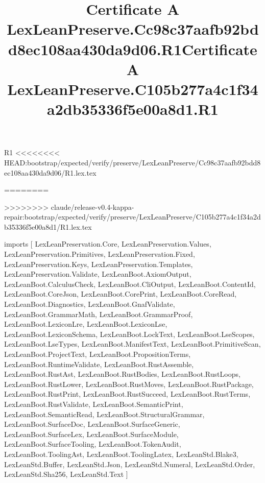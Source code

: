 \begin{lexlean}{R1}
<<<<<<<< HEAD:bootstrap/expected/verify/preserve/LexLeanPreserve/Cc98c37aafb92bdd8ec108aa430da9d06/R1.lex.tex
\title{Certificate A LexLeanPreserve.Cc98c37aafb92bdd8ec108aa430da9d06.R1}
========
\title{Certificate A LexLeanPreserve.C105b277a4c1f34a2db35336f5e00a8d1.R1}
>>>>>>>> claude/release-v0.4-kappa-repair:bootstrap/expected/verify/preserve/LexLeanPreserve/C105b277a4c1f34a2db35336f5e00a8d1/R1.lex.tex
\begin{coremodule}
imports [
  LexLeanPreservation.Core,
  LexLeanPreservation.Values,
  LexLeanPreservation.Primitives,
  LexLeanPreservation.Fixed,
  LexLeanPreservation.Keys,
  LexLeanPreservation.Templates,
  LexLeanPreservation.Validate,
  LexLeanBoot.AxiomOutput,
  LexLeanBoot.CalculusCheck,
  LexLeanBoot.CliOutput,
  LexLeanBoot.ContentId,
  LexLeanBoot.CoreJson,
  LexLeanBoot.CorePrint,
  LexLeanBoot.CoreRead,
  LexLeanBoot.Diagnostics,
  LexLeanBoot.GnafValidate,
  LexLeanBoot.GrammarMath,
  LexLeanBoot.GrammarProof,
  LexLeanBoot.LexiconLre,
  LexLeanBoot.LexiconLse,
  LexLeanBoot.LexiconSchema,
  LexLeanBoot.LockText,
  LexLeanBoot.LseScopes,
  LexLeanBoot.LseTypes,
  LexLeanBoot.ManifestText,
  LexLeanBoot.PrimitiveScan,
  LexLeanBoot.ProjectText,
  LexLeanBoot.PropositionTerms,
  LexLeanBoot.RuntimeValidate,
  LexLeanBoot.RustAssemble,
  LexLeanBoot.RustAst,
  LexLeanBoot.RustBodies,
  LexLeanBoot.RustLoops,
  LexLeanBoot.RustLower,
  LexLeanBoot.RustMoves,
  LexLeanBoot.RustPackage,
  LexLeanBoot.RustPrint,
  LexLeanBoot.RustSucceed,
  LexLeanBoot.RustTerms,
  LexLeanBoot.RustValidate,
  LexLeanBoot.SemanticPrint,
  LexLeanBoot.SemanticRead,
  LexLeanBoot.StructuralGrammar,
  LexLeanBoot.SurfaceDoc,
  LexLeanBoot.SurfaceGeneric,
  LexLeanBoot.SurfaceLex,
  LexLeanBoot.SurfaceModule,
  LexLeanBoot.SurfaceTooling,
  LexLeanBoot.TokenAudit,
  LexLeanBoot.ToolingAst,
  LexLeanBoot.ToolingLatex,
  LexLeanStd.Blake3,
  LexLeanStd.Buffer,
  LexLeanStd.Json,
  LexLeanStd.Numeral,
  LexLeanStd.Order,
  LexLeanStd.Sha256,
  LexLeanStd.Text
]


\end{coremodule}
\end{lexlean}
